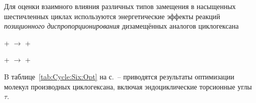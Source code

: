 Для оценки взаимного влияния различных типов замещения в насыщенных шестичленных циклах используются энергетические эффекты реакций \emph{позиционного диспропорционирования} дизамещённых аналогов циклогексана
\begin{center}
   +  \(\longrightarrow\)  + 
  
   +  \(\longrightarrow\)  + 
\end{center}

B таблице~\ref{tab:Cycle:Six:Opt} на с.~\pageref{tab:Cycle:Six:Opt}--\pageref{tab:Cycle:Six:Opt:Ends} приводятся результаты оптимизации молекул производных циклогексана, включая эндоциклические торсионные углы $\tau$.

\begin{center}
   \quad{} \quad{} \quad{} \quad{}
\end{center}

